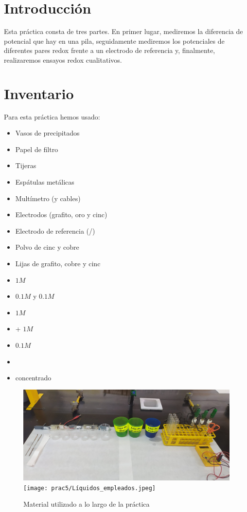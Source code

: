 \section{Introducción}
\noindent Esta práctica consta de tres partes. En primer lugar, mediremos la diferencia de potencial que hay en una pila, seguidamente mediremos los potenciales de diferentes pares redox frente a un electrodo de referencia y, finalmente, realizaremos ensayos redox cualitativos.

\vspace{0.4cm}
\section{Inventario}
Para esta práctica hemos usado:

\begin{multicols}{2}
    \begin{itemize}
        \item Vasos de precipitados
        \item Papel de filtro
        \item Tijeras
        \item Espátulas metálicas
        \item Multímetro (y cables)
        \item Electrodos (grafito, oro y cinc)
        \item Electrodo de referencia (/)
        \item Polvo de cinc y cobre
        \item Lijas de grafito, cobre y cinc
        \item {} $1M$
        \item {} $0.1M$ y  $0.1M$
        \item {} $1M$
        \item {} +  $1M$
        \item {} $0.1M$
        \item {}
        \item {} concentrado
    \end{itemize}
\end{multicols}

\begin{figure}[H]
    \centering
    \hspace*{-3cm}
        \includegraphics[scale = 0.2]{prac5/Material.jpeg}
        \texttt{[image: prac5/Líquidos\_empleados.jpeg]}
    \hspace*{-3cm}
    \caption{Material utilizado a lo largo de la práctica}
\end{figure}

